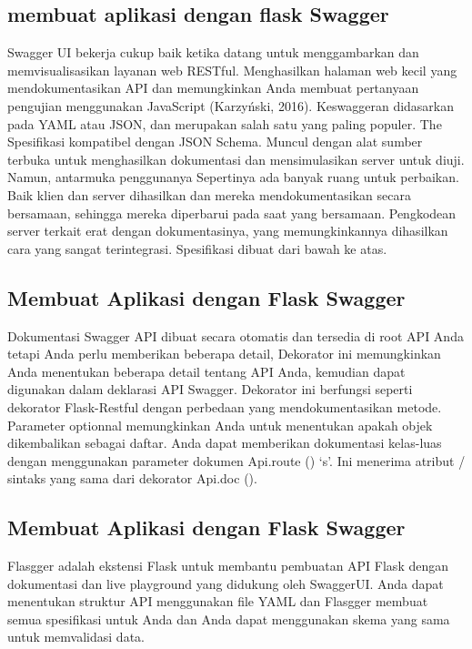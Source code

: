\subsection{membuat aplikasi dengan flask Swagger }
Swagger UI bekerja cukup baik ketika datang untuk menggambarkan dan memvisualisasikan layanan web RESTful. Menghasilkan halaman web kecil yang mendokumentasikan API dan memungkinkan Anda membuat pertanyaan pengujian menggunakan JavaScript (Karzyński, 2016). Keswaggeran didasarkan pada YAML atau JSON, dan merupakan salah satu yang paling populer. The Spesifikasi kompatibel dengan JSON Schema. Muncul dengan alat sumber terbuka untuk menghasilkan dokumentasi dan mensimulasikan server untuk diuji. Namun, antarmuka penggunanya Sepertinya ada banyak ruang untuk perbaikan. Baik klien dan server dihasilkan dan mereka mendokumentasikan secara bersamaan, sehingga mereka diperbarui pada saat yang bersamaan. Pengkodean server terkait erat dengan dokumentasinya, yang memungkinkannya dihasilkan cara yang sangat terintegrasi. Spesifikasi dibuat dari bawah ke atas\cite{ortegacatalogo}.

\subsection{Membuat Aplikasi dengan Flask Swagger}
Dokumentasi Swagger API dibuat secara otomatis dan tersedia di root API Anda tetapi Anda perlu memberikan beberapa detail, Dekorator ini memungkinkan Anda menentukan beberapa detail tentang API Anda, kemudian dapat digunakan dalam deklarasi API Swagger. Dekorator ini berfungsi seperti dekorator Flask-Restful dengan perbedaan yang mendokumentasikan metode. Parameter optionnal memungkinkan Anda untuk menentukan apakah objek dikembalikan sebagai daftar. Anda dapat memberikan dokumentasi kelas-luas dengan menggunakan parameter dokumen Api.route () ‘s’. Ini menerima atribut / sintaks yang sama dari dekorator Api.doc ()\cite{de2017api}.

\subsection{Membuat Aplikasi dengan Flask Swagger}
Flasgger adalah ekstensi Flask untuk membantu pembuatan API Flask dengan dokumentasi dan live playground yang didukung oleh SwaggerUI. Anda dapat menentukan struktur API menggunakan file YAML dan Flasgger membuat semua spesifikasi untuk Anda dan Anda dapat menggunakan skema yang sama untuk memvalidasi data.


